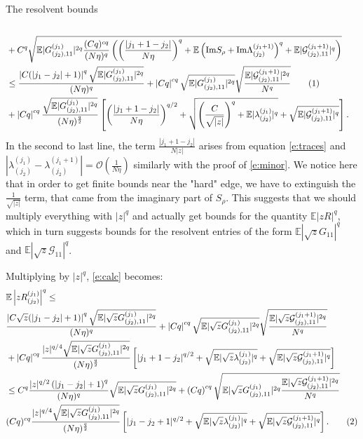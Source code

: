 \documentclass[11pt, a4paper, oneside]{book}
\numberwithin{equation}{chapter}
\newcommand{\E}{\mathbb E}
\newcommand\numberthis{\addtocounter{equation}{1}\tag{\theequation}}
\begin{document}
\begin{section}{The resolvent bounds}
\begin{align*}
\\
&+
 C^q\sqrt{ \E|G^{(j_1)}_{(j_2),11}|^{2q}
\frac{(Cq)^{cq}}{(N\eta)^q} \left( \left ( \frac{\left|j_1+1-j_2 \right|}{N\eta} \right)^{q} +  \E \left(\mathrm{Im} S_{\rho} +  \mathrm{Im} {\Lambda}^{(j_1+1)}_{(j_2)}\right)^q +   \E|\mathcal{G}^{(j_1+1)}_{(j_2),11}|^{q}\right)}
\\
&\leq \frac{ \left |C (|j_1- j_2|+1) \right |^q \sqrt{ \E |G^{(j_1)}_{(j_2),11}|^{2q} } }{(N\eta)^q} + \left|C q\right|^{cq} \sqrt{ \E|G^{(j_1)}_{(j_2),11}|^{2q} } \sqrt{ \frac{\E|\mathcal{G}^{(j_1+1)}_{(j_2),11}|^{2q}}{N^q}} \numberthis
\\
&+
 \left|Cq\right|^{cq}\frac{ \sqrt{ \E|G^{(j_1)}_{(j_2),11}|^{2q}}} {(N\eta)^{\frac{q}{2}}} \left[ \left ( \frac{\left|j_1+1- j_2 \right|}{N\eta} \right )^{q/2} +  \sqrt{\left ( \frac{C}{\sqrt{|z|}} \right )^q +\E|\lambda_{(j_2)}^{(j_1)}|^q} + \sqrt{\E|\mathcal{G}^{(j_1+1)}_{(j_2),11}|^{q}}\right] .
\end{align*}
%
In the second to last line, the term $\frac{|j_1+1-j_2|}{N|z|}$ arises from equation \eqref{e:traces} and $| \lambda_{(j_2)}^{(j_1)} - \lambda_{(j_2)}^{(j_1+1)}| = \mathcal{O} \left ( \frac{1}{N\eta} \right )$ similarly with the proof of \eqref{e:minor}. We notice here that in order to get finite bounds near the "hard" edge, we have to extinguish the $\frac{1}{\sqrt{|z|}}$ term, that came from the imaginary part of $S_{\rho}.$ This suggests that we should multiply everything with $|z|^q$ and actually get bounds for the quantity $\E |z R|^q$, which in turn suggests bounds for the resolvent entries of the form $\E|\sqrt{z} G_{11}|^q$ and $\E|\sqrt{z} \mathcal{G}_{11} |^q$.

Multiplying by $|z|^q$, \eqref{e:calc} becomes:
\begin{align*}
    &\E \left | z R^{(j_1)}_{(j_2)} \right |^q \leq \\
    &\frac{ \left |C \sqrt{z} (|j_1- j_2|+1) \right |^q \sqrt{ \E |\sqrt{z} G^{(j_1)}_{(j_2),11}|^{2q} } }{(N\eta)^q} + \left|C q\right|^{cq} \sqrt{ \E|\sqrt{z} G^{(j_1)}_{(j_2),11}|^{2q} } \sqrt{ \frac{\E|\sqrt{z} \mathcal{G}^{(j_1+1)}_{(j_2),11}|^{2q}}{N^q}} \\
    &+
    \left|Cq\right|^{cq}\frac{ |z|^{q/4} \sqrt{ \E|\sqrt{z} G^{(j_1)}_{(j_2),11}|^{2q}}} {(N\eta)^{\frac{q}{2}}} \left[ \left|j_1+1- j_2 \right|^{q/2} +  \sqrt{\E|\sqrt{z} \lambda_{(j_2)}^{(j_1)}|^q} + \sqrt{\E| \sqrt{z} \mathcal{G}^{(j_1+1)}_{(j_2),11}|^{q}}\right] \\
    &\leq
    C^q \frac{ |z|^{q/2} \left ( |j_1- j_2|+1 \right )^q  }{(N\eta)^q} \sqrt{ \E |\sqrt{z} G^{(j_1)}_{(j_2),11}|^{2q} } +  \left(C q\right)^{cq} \sqrt{ \E|\sqrt{z} G^{(j_1)}_{(j_2),11}|^{2q}  \frac{\E|\sqrt{z} \mathcal{G}^{(j_1+1)}_{(j_2),11}|^{2q}}{N^q} } \\
    &(Cq)^{cq} \frac{ |z|^{q/4} \sqrt{ \E|\sqrt{z} G^{(j_1)}_{(j_2),11}|^{2q}}} {(N\eta)^{\frac{q}{2}}} \left[ |j_1 - j_2 +1|^{q/2}+\sqrt{\E|\sqrt{z} \lambda_{(j_2)}^{(j_1)}|^q} + \sqrt{\E| \sqrt{z} \mathcal{G}^{(j_1+1)}_{(j_2),11}|^{q}}\right] . \numberthis
\end{align*} 


\end{section}
\end{document}
